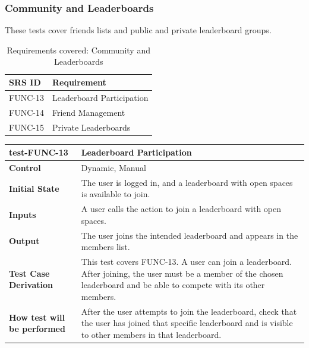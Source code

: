 \documentclass[12pt, titlepage]{article}
\begin{document}
\subsubsection{Community and Leaderboards}

These tests cover friends lists and public and private leaderboard groups.

\begin{table}[H]
  \caption{Requirements covered: Community and Leaderboards}
  \noindent\begin{tabularx}{\textwidth}{p{3cm}X}
  \toprule
  \textbf{SRS ID} & \textbf{Requirement} \\
  \midrule
  FUNC-13 & Leaderboard Participation \\
  FUNC-14 & Friend Management \\
  FUNC-15 & Private Leaderboards \\
  \bottomrule
\end{tabularx}
\end{table}

\vspace{1em}

\noindent\begin{tabularx}{\textwidth}{>{\raggedright\arraybackslash}p{3.5cm}X}
  \toprule
  \textbf{test-FUNC-13} & \textbf{Leaderboard Participation}\\
  \midrule
  \textbf{Control} & Dynamic, Manual\\
  \textbf{Initial State} & The user is logged in, and a leaderboard with open spaces is available to join.\\
  \textbf{Inputs} & A user calls the action to join a leaderboard with open spaces.\\
  \textbf{Output} & The user joins the intended leaderboard and appears in the members list.\\
  \textbf{Test Case Derivation} & This test covers FUNC-13. A user can join a leaderboard. After joining, the user must be a member of the chosen leaderboard and be able to compete with its other members.\\
  \textbf{How test will be performed} & After the user attempts to join the leaderboard, check that the user has joined that specific leaderboard and is visible to other members in that leaderboard.\\
  \bottomrule
\end{tabularx}

\vspace{1em}
\end{document}
